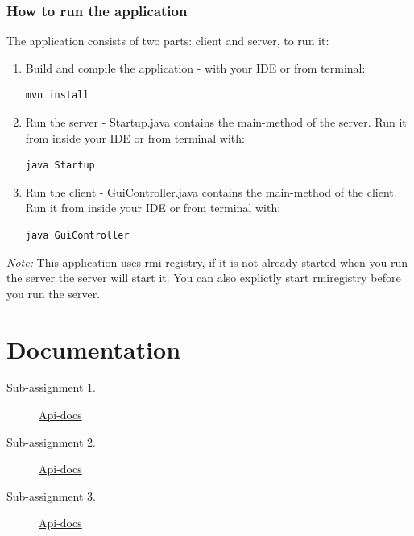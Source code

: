 \documentclass[a4paper, 11pt]{article}
\begin{document}
\subsubsection{How to run the application}
The application consists of two parts: client and server, to run it:
\begin{enumerate}
\item Build and compile the application - with your IDE or from terminal:
\begin{verbatim}
mvn install
\end{verbatim}
\item Run the server - Startup.java contains the main-method of the server. Run it from inside your IDE or from terminal with: 
\begin{verbatim}
java Startup
\end{verbatim}
\item Run the client - GuiController.java contains the main-method of the client. Run it from inside your IDE or from terminal with: 
\begin{verbatim}
java GuiController
\end{verbatim}
\end{enumerate}
\textit{Note:} This application uses rmi registry, if it is not already started when you run the server the server will start it. You can also explictly start rmiregistry before you run the server.
\newpage
\section{Documentation}
\begin{description}
\item[Sub-assignment 1.] \href{http://limmen.github.io/distributed_networking_project/ID2212project_assignment1/apidocs/index.html}{Api-docs} 
\item[Sub-assignment 2.] \href{http://limmen.github.io/distributed_networking_project/ID2212project_assignment2/apidocs/index.html}{Api-docs}
\item[Sub-assignment 3.] \href{http://limmen.github.io/distributed_networking_project/ID2212project_assignment3/apidocs/index.html}{Api-docs}
\end{description}
\newpage
\nocite{*}


\end{document}

